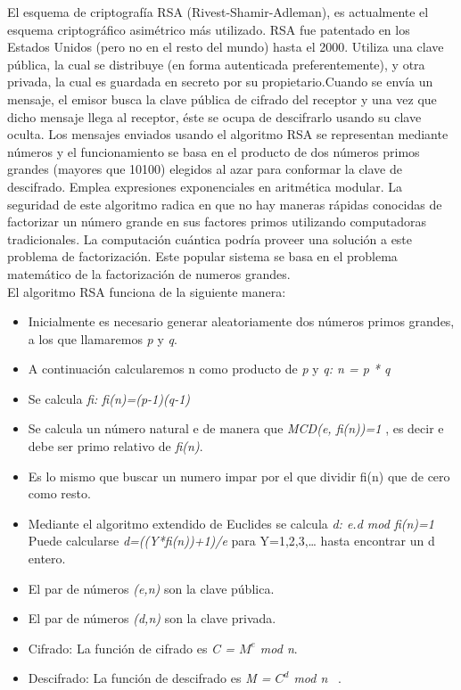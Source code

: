 El esquema de criptografía RSA (Rivest-Shamir-Adleman), es actualmente el esquema criptográfico asimétrico más utilizado. RSA fue patentado en los Estados Unidos (pero no en el resto del mundo) hasta el 2000. Utiliza una clave pública, la cual se distribuye (en forma autenticada preferentemente), y otra privada, la cual es guardada en secreto por su propietario.Cuando se envía un mensaje, el emisor busca la clave pública de cifrado del receptor y una vez que dicho mensaje llega al receptor, éste se ocupa de descifrarlo usando su clave oculta. Los mensajes enviados usando el algoritmo RSA se representan mediante números y el funcionamiento se basa en el producto de dos números primos grandes (mayores que 10100) elegidos al azar para conformar la clave de descifrado. Emplea expresiones exponenciales en aritmética modular. La seguridad de este algoritmo radica en que no hay maneras rápidas conocidas de factorizar un número grande en sus factores primos utilizando computadoras tradicionales.
La computación cuántica podría proveer una solución a este problema de factorización. Este popular sistema se basa en el problema matemático de la factorización de numeros grandes. \\
El algoritmo RSA funciona de la siguiente manera: \\
\begin{itemize}
\item Inicialmente es necesario generar aleatoriamente dos números primos grandes, a los que llamaremos \textit{p} y \textit{q}.
\item A continuación calcularemos n como producto de \textit{p} y \textit{q: n = p * q}
\item Se calcula \textit{fi: fi(n)=(p-1)(q-1)}
\item Se calcula un número natural e de manera que \textit{MCD(e, fi(n))=1} , es decir e debe ser primo relativo de \textit{fi(n)}.
\item Es lo mismo que buscar un numero impar por el que dividir fi(n) que de cero como resto.
\item Mediante el algoritmo extendido de Euclides se calcula \textit{d: e.d mod fi(n)=1} Puede calcularse \textit{d=((Y*fi(n))+1)/e} para Y=1,2,3,… hasta encontrar un d entero.
\item El par de números \textit{(e,n)} son la clave pública.
\item El par de números \textit{(d,n)} son la clave privada.
\item Cifrado: La función de cifrado es \textit{C = $M^{e}$ mod n}.
\item Descifrado: La función de descifrado es \textit{M = $C^{d}$ mod n}  ~\cite{paar}.
\end{itemize} 

